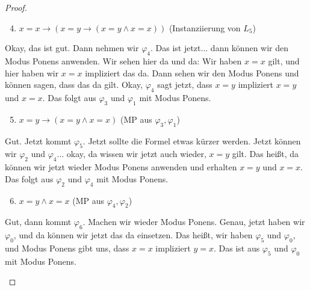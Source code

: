 \begin{proof}
\begin{math-stroke}
\begin{enumerate}[label=$\varphi_{\mathbf{\arabic*}}:$]
    \setcounter{enumi}{3} \item $x = x \rightarrow (x = y \rightarrow (x = y \wedge x = x))$ \hfill (Instanziierung von $L_5$)
\end{enumerate}
\end{math-stroke}

\begin{spoken-clean}[01:02:13 - 01:03:08]
Okay, das ist gut. Dann nehmen wir $\varphi_4$. Das ist jetzt... dann können wir den Modus Ponens anwenden. Wir sehen hier da und da: Wir haben $x=x$ gilt, und hier haben wir $x=x$ impliziert das da. Dann sehen wir den Modus Ponens und können sagen, dass das da gilt. Okay, $\varphi_4$ sagt jetzt, dass $x=y$ impliziert $x=y$ und $x=x$. Das folgt aus $\varphi_3$ und $\varphi_1$ mit Modus Ponens.
\end{spoken-clean}

\begin{math-stroke}
\begin{enumerate}[label=$\varphi_{\mathbf{\arabic*}}:$]
    \setcounter{enumi}{4} \item $x = y \rightarrow (x = y \wedge x = x)$ \hfill (MP aus $\varphi_3, \varphi_1$)
\end{enumerate}
\end{math-stroke}

\begin{spoken-clean}[01:03:09 - 01:03:47]
Gut. Jetzt kommt $\varphi_5$. Jetzt sollte die Formel etwas kürzer werden. Jetzt können wir $\varphi_2$ und $\varphi_4$... okay, da wissen wir jetzt auch wieder, $x=y$ gilt. Das heißt, da können wir jetzt wieder Modus Ponens anwenden und erhalten $x=y$ und $x=x$. Das folgt aus $\varphi_2$ und $\varphi_4$ mit Modus Ponens.
\end{spoken-clean}

\begin{math-stroke}
\begin{enumerate}[label=$\varphi_{\mathbf{\arabic*}}:$]
    \setcounter{enumi}{5} \item $x = y \wedge x = x$ \hfill (MP aus $\varphi_4, \varphi_2$)
\end{enumerate}
\end{math-stroke}

\begin{spoken-clean}[01:03:48 - 01:04:33]
Gut, dann kommt $\varphi_6$. Machen wir wieder Modus Ponens. Genau, jetzt haben wir $\varphi_0$, und da können wir jetzt das da einsetzen. Das heißt, wir haben $\varphi_5$ und $\varphi_0$, und Modus Ponens gibt uns, dass $x=x$ impliziert $y=x$. Das ist aus $\varphi_5$ und $\varphi_0$ mit Modus Ponens.
\end{spoken-clean}


\end{proof}
